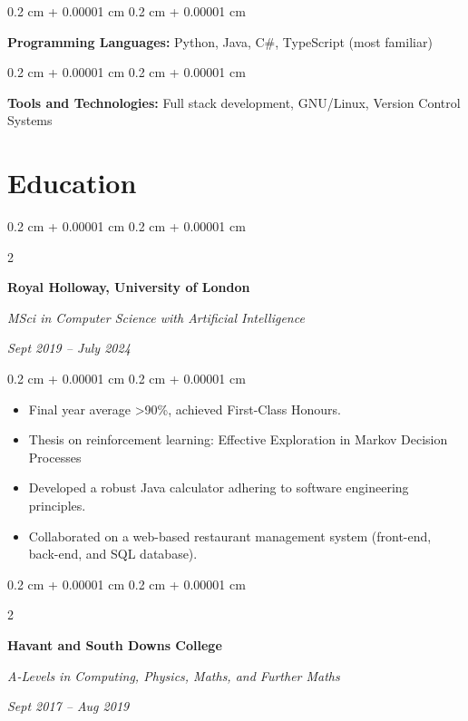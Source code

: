\documentclass[10pt, letterpaper]{article}
\newenvironment{highlights}{
    \begin{itemize}[
        topsep=0.10 cm,
        parsep=0.10 cm,
        partopsep=0pt,
        itemsep=0pt,
        leftmargin=0.4 cm + 10pt
    ]
}{
    \end{itemize}
} %
\newenvironment{onecolentry}{
    \begin{adjustwidth}{
        0.2 cm + 0.00001 cm
    }{
        0.2 cm + 0.00001 cm
    }
}{
    \end{adjustwidth}
} %
\newenvironment{twocolentry}[2][]{
    \onecolentry
    \def\secondColumn{#2}
    \setcolumnwidth{\fill, 4.5 cm}
    \begin{paracol}{2}
}{
    \switchcolumn \raggedleft \secondColumn
    \end{paracol}
    \endonecolentry
} %
\begin{document}
        
        \begin{onecolentry}
            \textbf{Programming Languages:} Python, Java, C\#, TypeScript (most familiar)
        \end{onecolentry}

        \vspace{0.2 cm}

        \begin{onecolentry}
            \textbf{Tools and Technologies:} Full stack development, GNU/Linux, Version Control Systems
        \end{onecolentry}


    
    \section{Education}



        
        \begin{twocolentry}{
            
            
        \textit{Sept 2019 – July 2024}}
            \textbf{Royal Holloway, University of London}

            \textit{MSci in Computer Science with Artificial Intelligence}
        \end{twocolentry}

        \vspace{0.10 cm}
        \begin{onecolentry}
            \begin{highlights}
                \item Final year average \textgreater 90\%, achieved First-Class Honours.
                \item Thesis on reinforcement learning: Effective Exploration in Markov Decision Processes
                \item Developed a robust Java calculator adhering to software engineering principles.
                \item Collaborated on a web-based restaurant management system (front-end, back-end, and SQL database).
            \end{highlights}
        \end{onecolentry}


        \vspace{0.2 cm}

        \begin{twocolentry}{
            
            
        \textit{Sept 2017 – Aug 2019}}
            \textbf{Havant and South Downs College}

            \textit{A-Levels in Computing, Physics, Maths, and Further Maths}
        \end{twocolentry}
\end{document}
